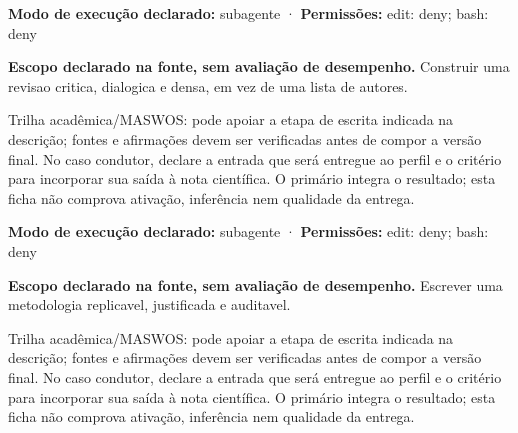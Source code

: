 \begin{arquitetura}
\textbf{Modo de execução declarado:} subagente · \textbf{Permissões:} edit: deny; bash: deny
\end{arquitetura}


\begin{descricao}
\textbf{Escopo declarado na fonte, sem avaliação de desempenho.}
Construir uma revisao critica, dialogica e densa, em vez de uma lista de autores.
\end{descricao}

\begin{funcao}
Trilha acadêmica/MASWOS: pode apoiar a etapa de escrita indicada na descrição; fontes e afirmações devem ser verificadas antes de compor a versão final. No caso condutor, declare a entrada que será entregue ao perfil e o critério para incorporar sua saída à nota científica. O primário integra o resultado; esta ficha não comprova ativação, inferência nem qualidade da entrega.
\end{funcao}

\begin{arquitetura}
\textbf{Modo de execução declarado:} subagente · \textbf{Permissões:} edit: deny; bash: deny
\end{arquitetura}


\begin{descricao}
\textbf{Escopo declarado na fonte, sem avaliação de desempenho.}
Escrever uma metodologia replicavel, justificada e auditavel.
\end{descricao}

\begin{funcao}
Trilha acadêmica/MASWOS: pode apoiar a etapa de escrita indicada na descrição; fontes e afirmações devem ser verificadas antes de compor a versão final. No caso condutor, declare a entrada que será entregue ao perfil e o critério para incorporar sua saída à nota científica. O primário integra o resultado; esta ficha não comprova ativação, inferência nem qualidade da entrega.
\end{funcao}

